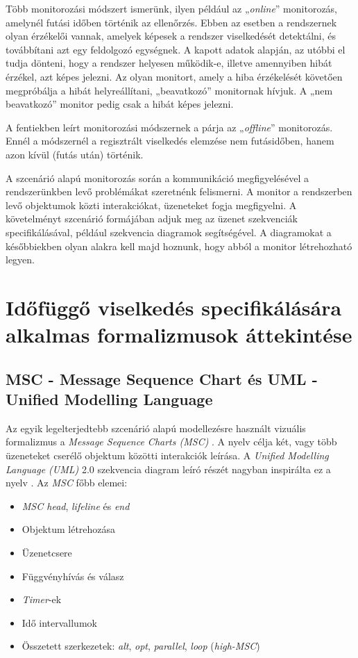 Több monitorozási módszert ismerünk, ilyen például az „\textit{online}” \cite{RuntimeVerification1} monitorozás, amelynél futási időben történik az ellenőrzés.
Ebben az esetben a rendszernek olyan érzékelői vannak, amelyek képesek a rendszer viselkedését detektálni, és továbbítani azt egy feldolgozó egységnek.
A kapott adatok alapján, az utóbbi el tudja dönteni, hogy a rendszer helyesen működik-e, illetve amennyiben hibát érzékel, azt képes jelezni.
Az olyan monitort, amely a hiba érzékelését követően megpróbálja a hibát helyreállítani, „beavatkozó” monitornak hívjuk.
A „nem beavatkozó” monitor pedig csak a hibát képes jelezni.

A fentiekben leírt monitorozási módszernek a párja az „\textit{offline}” \cite{RuntimeVerification1} monitorozás.
Ennél a módszernél a regisztrált viselkedés elemzése nem futásidőben, hanem azon kívül (futás után) történik.

A szcenárió alapú monitorozás során a kommunikáció megfigyelésével a rendszerünkben levő problémákat szeretnénk felismerni.
A monitor a rendszerben levő objektumok közti interakciókat, üzeneteket fogja megfigyelni.
A követelményt szcenárió formájában adjuk meg az üzenet szekvenciák specifikálásával, például szekvencia diagramok segítségével.
A diagramokat a későbbiekben olyan alakra kell majd hoznunk, hogy abból a monitor létrehozható legyen.

\section{Időfüggő viselkedés specifikálására alkalmas formalizmusok áttekintése}
\subsection{MSC - Message Sequence Chart és UML - Unified Modelling Language}

Az egyik legelterjedtebb szcenárió alapú modellezésre használt vizuális formalizmus a \textit{Message Sequence Charts (MSC)} \cite{MSC1}.
A nyelv célja két, vagy több üzeneteket cserélő objektum közötti interakciók leírása.
A \textit{Unified Modelling Language (UML)} 2.0 \cite{UML1} szekvencia diagram leíró részét nagyban inspirálta ez a nyelv \cite{MSC1}.
Az \textit{MSC} főbb elemei:

\begin{itemize}
\item \textit{MSC head}, \textit{lifeline} és \textit{end}
\item Objektum létrehozása
\item Üzenetcsere
\item Függvényhívás és válasz
\item \textit{Timer}-ek
\item Idő intervallumok
\item Összetett szerkezetek: \textit{alt}, \textit{opt}, \textit{parallel}, \textit{loop} (\textit{high-MSC})
\end{itemize}

